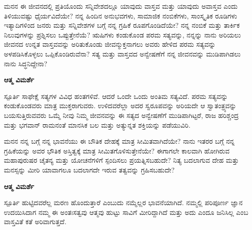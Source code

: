 \newpage
\begin{mananam}{\kanfont ಮನನ}
\footnotesize \mananamfont ಈ ಜೀವನದಲ್ಲಿ ಪ್ರತಿಯೊಂದು ಸನ್ನಿವೇಶದಲ್ಲೂ ಯಾವುದು ವಾಸ್ತವ ಮತ್ತು ಯಾವುದು ಅವಾಸ್ತವ ಎಂದು ತಿಳಿಯುವಷ್ಟು ಧೈರ್ಯವಿದೆಯೇ? ನನ್ನ ಹಿಂದಿನ ಅನುಭವಗಳು, ಸಾಮಾಜಿಕ ನಂಬಿಕೆಗಳು, ಸಾಂಸ್ಕೃತಿಕ ರೂಡಿಗಳು ಇತ್ಯಾದಿಗಳಿಂದ ಜನರು ಮತ್ತು ಸನ್ನಿವೇಶಗಳ ಬಗ್ಗೆ ನನ್ನ ಗ್ರಹಿಕೆ ರೂಪಗೊಂಡಿದೆಯೇ? ನನ್ನ ನಂಬಿಕೆ ಮತ್ತು ತಾರ್ಕಿಕ ನಿಲುವುಗಳನ್ನು ಪ್ರಶ್ನಿಸಲು ಒಪ್ಪುತ್ತೇನೆಯೆ? ಋಷಿಗಳು ಕಂಡುಕೊಂಡ ಪರಮ ಸತ್ಯವನ್ನು, ನನ್ನನ್ನು ನಾನು ಅರಿಯಲು ಜೀವನದ ಉನ್ನತ ವಾಸ್ತವವನ್ನು ಅರಿತುಕೊಂಡು ಜೀವನ್ಮುಕ್ತನಾಗಲು ಅವರು ಹೇಳಿದ ಪರಮ ಸತ್ಯವನ್ನು ಅಳಪಡಿಸಿಕೊಳ್ಳಲು ಒಪ್ಪಿಕೊಂಡಿರುವೆನಾ? ಸತ್ಯ ಮತ್ತು ವಾಸ್ತವದ ಅನ್ವೇಷಣೆಗೆ ನನ್ನ ಜೀವನವನ್ನು ಮುಡಿಪಾಗಿಡಲು ನಾನು ಸಿದ್ಧನಿದ್ದೇನಾ?
\end{mananam}
\WritingHand\enspace\textbf{ಆತ್ಮ ವಿಮರ್ಶೆ}
\begin{inspiration}{\kanfont ಸ್ಪೂರ್ತಿ}
\footnotesize \mananamfont ಸಾಫೇಕ್ಷೆ ಸತ್ಯಗಳ ವಿವಿಧ ಹಂತಗಳಿವೆ. ಆದರೆ ಒಂದೇ ಒಂದು ಅಂತಿಮ ಸತ್ಯವಿದೆ. ಪರಮ ಸತ್ಯವನ್ನು ಕಂಡುಕೊಂಡವರು ಮಾತ್ರ ಮುಕ್ತರಾಗುವರು. ಉಳಿದವರೆಲ್ಲಾ ಅದರ ಸ್ವರೂಪವನ್ನು ಅರಿಯದೇ ಆ ಸ್ವಾತಂತ್ರ್ಯವನ್ನು ಬಯಸುತ್ತಿರುವವರು ಒಮ್ಮೆ ನೀವು ನಿಮ್ಮ ಜೀವನವನ್ನು ಈ ಸತ್ಯದ ಅನ್ವೇಷಣೆಗೆ ಮುಡಿಪಾಗಿಟ್ಟರೆ, ರಾಜ ಹರಿಶ್ಚಂದ್ರ ಮತ್ತು ಭಗವಾನ್ ರಾಮನಂತೆ ಮಾನಸಿಕ ಬಲ ಮತ್ತು ಅತ್ಯುನ್ನತ ಶಕ್ತಿಯನ್ನು ಪಡೆಯುವಿರಿ.
\end{inspiration}
\newpage


\begin{mananam}{\kanfont ಮನನ}
\footnotesize \mananamfont ನನ್ನ ಬಗ್ಗೆ ನನ್ನ ಭಾವನೆಯು ಈ ಬೌತಿಕ ದೇಹಕ್ಕೆ ಮಾತ್ರ ಸೀಮಿತವಾಗಿದೆಯೇ? ನಾನು ಇತರರ ಬಗ್ಗೆ ನನ್ನ ಗ್ರಹಿಕೆಯನ್ನು ಅವರ ಭೌತಿಕ ಅಸ್ತಿತ್ವಕ್ಕೆ ಮಾತ್ರ ಸೀಮಿತಗೊಳಿಸುತ್ತೇನೆಯೇ? ಈಗಾಗಲೇ ಕಾಲವಾಗಿ ಹೋಗಿರುವ ಮಹಾಪುರುಷರ ಚೈತನ್ಯ ಮತ್ತು ಯೋಚನೆಗಳಿಗೆ ಸ್ಪಂದಿಸಲು ಪ್ರಯತ್ನಿಸಬಹುದೇ? ನಿತ್ಯ ಬದಲಾಗುವ ದೇಹ ಮತ್ತು ಮನಸ್ಸನ್ನು ಮೀರಿ ಯಾವಾಗಲೂ ಬದಲಾಗದೇ ಇರುವ ತತ್ವವನ್ನು ಗ್ರಹಿಸಬಹುದೇ?
\end{mananam}
\WritingHand\enspace\textbf{ಆತ್ಮ ವಿಮರ್ಶೆ}
\begin{inspiration}{\kanfont ಸ್ಪೂರ್ತಿ}
\footnotesize \mananamfont ಹುಟ್ಟಿದವರೆಲ್ಲ ಮರಣ ಹೊಂದುತ್ತಾರೆ ಎಂಬುದು ನಮ್ಮೆಲ್ಲರ ಭಾವನೆಯಾಗಿದೆ. ನಮ್ಮಲ್ಲಿ ಪರಿಪೂರ್ಣ ಜ್ಞಾನ ಉದಯಿಸಿದಾಗ ನಮ್ಮ ಈ ಅಂತಃಸತ್ವವು ಆತ್ಮವು ಹುಟ್ಟು ಸಾವಿಗೆ ಮೀರಿದ್ದಾಗಿದೆ ಮತ್ತು ಅದು ಎಂದೂ ಜನಿಸಿಲ್ಲ ಎಂಬ ವಾಸ್ತವಿತೆ ಕತೆ ಅರಿವಾಗುತ್ತದೆ.
\end{inspiration}

